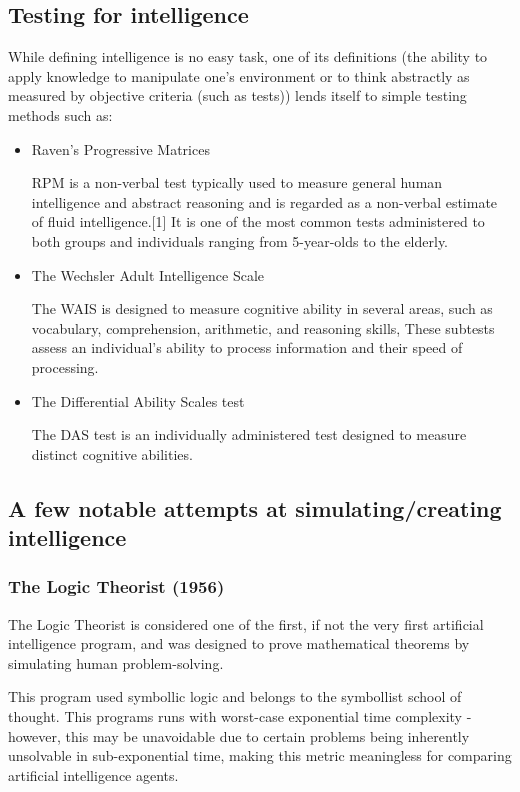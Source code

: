 \documentclass[masterthesis]{fer}
\begin{document}
\subsection{Testing for intelligence}
While defining intelligence is no easy task, one of its definitions (the ability to apply knowledge to manipulate one's environment or to think abstractly as measured by objective criteria (such as tests)) lends itself to simple testing methods such as:
\begin{itemize}
\item{Raven's Progressive Matrices}

RPM is a non-verbal test typically used to measure general human intelligence and abstract reasoning and is regarded as a non-verbal estimate of fluid intelligence.[1] It is one of the most common tests administered to both groups and individuals ranging from 5-year-olds to the elderly.
\item{The Wechsler Adult Intelligence Scale}

The WAIS is designed to measure cognitive ability in several areas, such as vocabulary, comprehension, arithmetic, and reasoning skills, These subtests assess an individual's ability to process information and their speed of processing.
\item{The Differential Ability Scales test}

The DAS test is an individually administered test designed to measure distinct cognitive abilities.
\end{itemize}

\subsection{A few notable attempts at simulating/creating intelligence}
\subsubsection{The Logic Theorist (1956)}
The Logic Theorist is considered one of the first, if not the very first artificial intelligence program, and was designed to prove mathematical theorems by simulating human problem-solving.

This program used symbollic logic and belongs to the symbollist school of thought. This programs runs with worst-case exponential time complexity - however, this may be unavoidable due to certain problems being inherently unsolvable in sub-exponential time, making this metric meaningless for comparing artificial intelligence agents.
\end{document}
